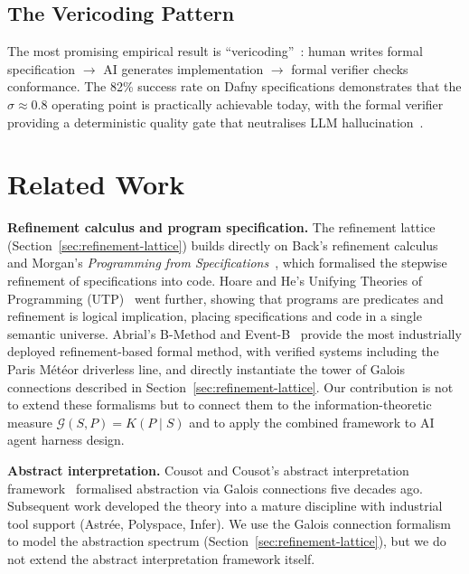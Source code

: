 \documentclass[11pt, a4paper, copyright]{googledeepmind}
\begin{document}
\subsection{The Vericoding Pattern}

The most promising empirical result is ``vericoding''~\citep{vericoding2025}: human writes formal specification $\to$ AI generates implementation $\to$ formal verifier checks conformance. The 82\% success rate on Dafny specifications demonstrates that the $\sigma \approx 0.8$ operating point is practically achievable today, with the formal verifier providing a deterministic quality gate that neutralises LLM hallucination~\citep{kleppmann2025formal}.


\section{Related Work}
\label{sec:related-work}

\textbf{Refinement calculus and program specification.} The refinement lattice (Section~\ref{sec:refinement-lattice}) builds directly on Back's refinement calculus~\citep{back1980correctness} and Morgan's \emph{Programming from Specifications}~\citep{morgan1994programming}, which formalised the stepwise refinement of specifications into code. Hoare and He's Unifying Theories of Programming (UTP)~\citep{hoare1998unifying} went further, showing that programs are predicates and refinement is logical implication, placing specifications and code in a single semantic universe. Abrial's B-Method and Event-B~\citep{abrial2010modeling} provide the most industrially deployed refinement-based formal method, with verified systems including the Paris M\'{e}t\'{e}or driverless line, and directly instantiate the tower of Galois connections described in Section~\ref{sec:refinement-lattice}. Our contribution is not to extend these formalisms but to connect them to the information-theoretic measure $\mathcal{G}(S, P) = K(P \mid S)$ and to apply the combined framework to AI agent harness design.

\textbf{Abstract interpretation.} Cousot and Cousot's abstract interpretation framework~\citep{cousot1977abstract} formalised abstraction via Galois connections five decades ago. Subsequent work developed the theory into a mature discipline with industrial tool support (Astr\'{e}e, Polyspace, Infer). We use the Galois connection formalism to model the abstraction spectrum (Section~\ref{sec:refinement-lattice}), but we do not extend the abstract interpretation framework itself.
\end{document}
